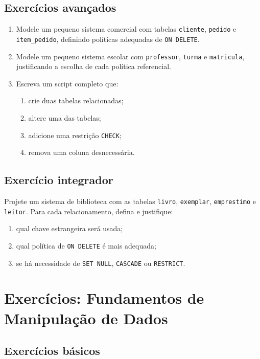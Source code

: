 \subsection{Exercícios avançados}

\begin{enumerate}
    \item Modele um pequeno sistema comercial com tabelas \texttt{cliente}, \texttt{pedido} e \texttt{item\_pedido}, definindo políticas adequadas de \texttt{ON DELETE}.
    \item Modele um pequeno sistema escolar com \texttt{professor}, \texttt{turma} e \texttt{matricula}, justificando a escolha de cada política referencial.
    \item Escreva um script completo que:
    \begin{enumerate}
        \item crie duas tabelas relacionadas;
        \item altere uma das tabelas;
        \item adicione uma restrição \texttt{CHECK};
        \item remova uma coluna desnecessária.
    \end{enumerate}
\end{enumerate}

\subsection{Exercício integrador}

Projete um sistema de biblioteca com as tabelas \texttt{livro}, \texttt{exemplar}, \texttt{emprestimo} e \texttt{leitor}. Para cada relacionamento, defina e justifique:

\begin{enumerate}
    \item qual chave estrangeira será usada;
    \item qual política de \texttt{ON DELETE} é mais adequada;
    \item se há necessidade de \texttt{SET NULL}, \texttt{CASCADE} ou \texttt{RESTRICT}.
\end{enumerate}



\section{Exercícios: Fundamentos de Manipulação de Dados}
\subsection{Exercícios básicos}


